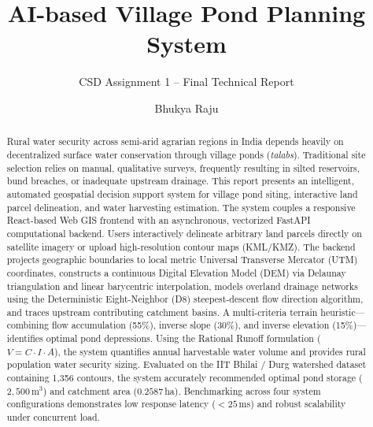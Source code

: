 \documentclass[manuscript,screen,review]{acmart}
\begin{document}
\title{AI-based Village Pond Planning System}
\subtitle{CSD Assignment 1 -- Final Technical Report}

\author{Bhukya Raju}

\renewcommand{\shortauthors}{Bhukya Raju}

\begin{abstract}
Rural water security across semi-arid agrarian regions in India depends heavily on decentralized surface water conservation through village ponds (\textit{talabs}). Traditional site selection relies on manual, qualitative surveys, frequently resulting in silted reservoirs, bund breaches, or inadequate upstream drainage. This report presents an intelligent, automated geospatial decision support system for village pond siting, interactive land parcel delineation, and water harvesting estimation. The system couples a responsive React-based Web GIS frontend with an asynchronous, vectorized FastAPI computational backend. Users interactively delineate arbitrary land parcels directly on satellite imagery or upload high-resolution contour maps (KML/KMZ). The backend projects geographic boundaries to local metric Universal Transverse Mercator (UTM) coordinates, constructs a continuous Digital Elevation Model (DEM) via Delaunay triangulation and linear barycentric interpolation, models overland drainage networks using the Deterministic Eight-Neighbor (D8) steepest-descent flow direction algorithm, and traces upstream contributing catchment basins. A multi-criteria terrain heuristic---combining flow accumulation (55\%), inverse slope (30\%), and inverse elevation (15\%)---identifies optimal pond depressions. Using the Rational Runoff formulation ($V = C \cdot I \cdot A$), the system quantifies annual harvestable water volume and provides rural population water security sizing. Evaluated on the IIT Bhilai / Durg watershed dataset containing 1,356 contours, the system accurately recommended optimal pond storage ($2,500\,\text{m}^3$) and catchment area ($0.2587$\,ha). Benchmarking across four system configurations demonstrates low response latency ($<25$\,ms) and robust scalability under concurrent load.
\end{abstract}
\end{document}
